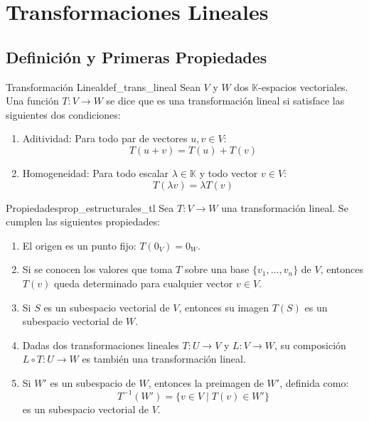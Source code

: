 \documentclass[11pt, a4paper]{article}
\begin{document}
\newpage

\section{Transformaciones Lineales}

\subsection{Definición y Primeras Propiedades}

\begin{definicion}{Transformación Lineal}{def_trans_lineal}
Sean $V$ y $W$ dos $\mathbb{K}$-espacios vectoriales.
Una función $T: V \to W$ se dice que es una transformación lineal si satisface las siguientes dos condiciones:

\begin{enumerate}
    \item Aditividad:
    Para todo par de vectores $u, v \in V$:
    \[ T(u + v) = T(u) + T(v) \]
    \item Homogeneidad:
    Para todo escalar $\lambda \in \mathbb{K}$ y todo vector $v \in V$:
    \[ T(\lambda v) = \lambda T(v) \]
\end{enumerate}
\end{definicion}

\begin{proposicion}{Propiedades}{prop_estructurales_tl}
Sea $T: V \to W$ una transformación lineal. Se cumplen las siguientes propiedades:

\begin{enumerate}
    \item El origen es un punto fijo: $T(0_V) = 0_W$.
    \item Si se conocen los valores que toma $T$ sobre una base $\{v_1, \dots, v_n\}$ de $V$, entonces $T(v)$ queda determinado para cualquier vector $v \in V$.
    \item Si $S$ es un subespacio vectorial de $V$, entonces su imagen $T(S)$ es un subespacio vectorial de $W$.
    \item Dadas dos transformaciones lineales $T: U \to V$ y $L: V \to W$, su composición $L \circ T: U \to W$ es también una transformación lineal.
    \item Si $W'$ es un subespacio de $W$, entonces la preimagen de $W'$, definida como:
    \[ T^{-1}(W') = \{ v \in V \mid T(v) \in W' \} \]
    es un subespacio vectorial de $V$.
\end{enumerate}
\end{proposicion}
\end{document}

